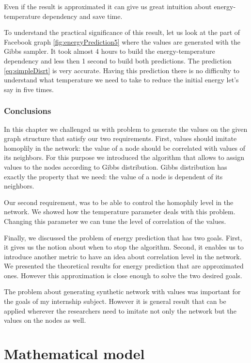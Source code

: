 \documentclass[12pt]{report}
\begin{document}
Even if the result is approximated it can give us great intuition about energy-temperature dependency and save time.

To understand the practical significance of this result, let us look at the part of Facebook graph \ref{fig:energyPrediction5} where the values are generated with the Gibbs sampler. It took almost 4 hours to build the energy-temperature dependency and less then 1 second to build both predictions. The prediction \ref{eq:simpleDisrt} is very accurate. Having this prediction there is no difficulty to understand what temperature we need to take to reduce the initial energy let's say in five times.
\subsection{Conclusions}

In this chapter we challenged us with problem to generate the values on the given graph structure that satisfy our two requirements. First, values should imitate homoplily in the network: the value of a node should be correlated with values of its neighbors. For this purpose we introduced the algorithm that allows to assign values to the nodes according to Gibbs distribution. Gibbs distribution has exactly the property that we need: the value of a node is dependent of its neighbors.

Our second requirement, was to be able to control the homophily level in the network. We showed how the temperature parameter deals with this problem. Changing this parameter we can tune the level of correlation of the values.

Finally, we discussed the problem of energy prediction that has two goals. First, it gives us the notion about when to stop the algorithm. Second, it enables us to introduce another metric to have an idea about correlation level in the network. We presented the theoretical results for energy prediction that are approximated ones. However this approximation is close enough to solve the two desired goals.

The problem about generating synthetic network with values was important for the goals of my internship subject. However it is general result that can be applied wherever the researchers need to imitate not only the network but the values on the nodes as well.

\chapter{Mathematical model}
\end{document}

